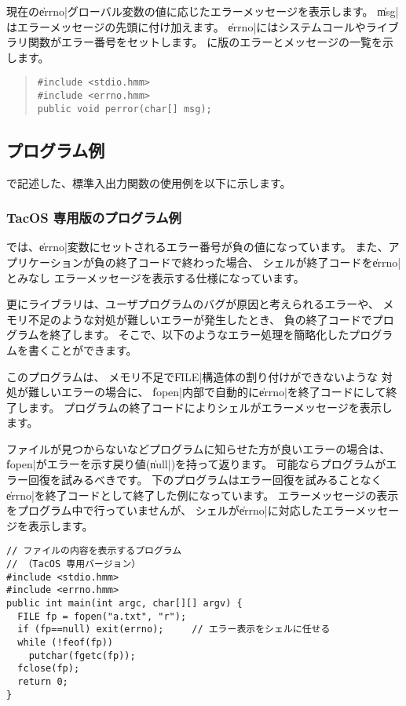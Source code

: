 現在の\|errno|グローバル変数の値に応じたエラーメッセージを表示します。
\|msg|はエラーメッセージの先頭に付け加えます。
\|errno|にはシステムコールやライブラリ関数がエラー番号をセットします。
に\tac 版のエラーとメッセージの一覧を示します。

\begin{quote}
\begin{verbatim}
#include <stdio.hmm>
#include <errno.hmm>
public void perror(char[] msg);
\end{verbatim}
\end{quote}

\subsection{プログラム例}

\cmml で記述した、標準入出力関数の使用例を以下に示します。

\subsubsection{TacOS 専用版のプログラム例}

\tacos では、\|errno|変数にセットされるエラー番号が負の値になっています。
また、アプリケーションが負の終了コードで終わった場合、
シェルが終了コードを\|errno|とみなし
エラーメッセージを表示する仕様になっています。

更にライブラリは、ユーザプログラムのバグが原因と考えられるエラーや、
メモリ不足のような対処が難しいエラーが発生したとき、
負の終了コードでプログラムを終了します。
そこで、以下のようなエラー処理を簡略化したプログラムを書くことができます。

このプログラムは、
メモリ不足で\|FILE|構造体の割り付けができないような
対処が難しいエラーの場合に、
\|fopen|内部で自動的に\|errno|を終了コードにして終了します。
プログラムの終了コードによりシェルがエラーメッセージを表示します。

ファイルが見つからないなどプログラムに知らせた方が良いエラーの場合は、
\|fopen|がエラーを示す戻り値(\|null|)を持って返ります。
可能なら{\cmm}プログラムがエラー回復を試みるべきです。
下のプログラムはエラー回復を試みることなく
\|errno|を終了コードとして終了した例になっています。
エラーメッセージの表示をプログラム中で行っていませんが、
シェルが\|errno|に対応したエラーメッセージを表示します。

\begin{mylist}
\begin{verbatim}
// ファイルの内容を表示するプログラム
// （TacOS 専用バージョン）
#include <stdio.hmm>
#include <errno.hmm>
public int main(int argc, char[][] argv) {
  FILE fp = fopen("a.txt", "r");
  if (fp==null) exit(errno);     // エラー表示をシェルに任せる
  while (!feof(fp))
    putchar(fgetc(fp));
  fclose(fp);
  return 0;
}
\end{verbatim}
\end{mylist}

